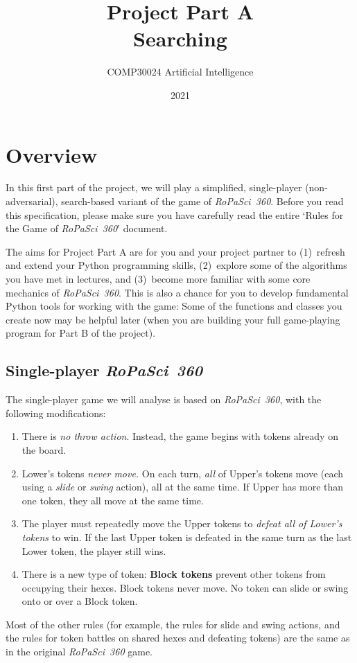\documentclass[]{article}
\title{
    {\LARGE Project Part A}
    \\[1ex]
    {\Huge\bf Searching}
}
\author{
    COMP30024 Artificial Intelligence
}
\date{2021}
\begin{document}
\maketitle


\section*{Overview}

In this first part of the project, we will play a simplified, single-player
(non-adversarial), search-based variant of the game of \emph{RoPaSci~360}.
Before you read this specification, please make sure you have carefully
read the entire `Rules for the Game of \emph{RoPaSci~360}' document.

The aims for Project Part A are for you and your project partner to
(1)~refresh and extend your Python programming skills,
(2)~explore some of the algorithms you have met in lectures, and
(3)~become more familiar with some core mechanics of \emph{RoPaSci~360}.
%
This is also a chance for you to develop fundamental Python tools for
working with the game:
Some of the functions and classes you create now may be helpful later
(when you are building your full game-playing program for Part B of
the project).


\subsection*{Single-player \emph{RoPaSci~360}}

The single-player game we will analyse is based on \emph{RoPaSci~360},
with the following modifications:
%
\begin{enumerate}
    \item
        There is \emph{no throw action}. Instead, the game begins with
        tokens already on the board.
    \item
        Lower's tokens \emph{never move.}
        On each turn, \emph{all} of Upper's tokens move (each using a
        \emph{slide} or \emph{swing} action), all at the same time.
        If Upper has more than one token, they all move at the same time.
    \item
        The player must repeatedly move the Upper tokens to \emph{defeat
        all of Lower's tokens} to win.
        If the last Upper token is defeated in the same turn as the last
        Lower token, the player still wins.
    \item
        There is a new type of token:
        \textbf{Block tokens} prevent other tokens from occupying their
        hexes. Block tokens never move. No token can slide or swing onto
        or over a Block token.
\end{enumerate}
%
Most of the other rules (for example, the rules for slide and swing actions,
and the rules for token battles on shared hexes and defeating tokens) are
the same as in the original \emph{RoPaSci~360} game.
\end{document}
